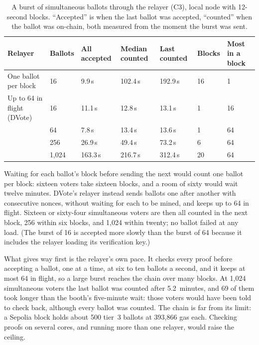 \begin{table}[htbp]
  \centering
  \caption{A burst of simultaneous ballots through the relayer (C3), local
    node with 12-second blocks. ``Accepted'' is when the last ballot was
    accepted, ``counted'' when the ballot was on-chain, both measured from the
    moment the burst was sent.}
  \label{tab:c3}
  \small
  \begin{tabular}{@{}L{3.6cm}R{1.4cm}R{2.0cm}R{2.0cm}R{2.0cm}R{1.4cm}R{2.0cm}@{}}
    \toprule
    \textbf{Relayer} & \textbf{Ballots} & \textbf{All accepted} & \textbf{Median counted} & \textbf{Last counted} & \textbf{Blocks} & \textbf{Most in a block} \\
    \midrule
    One ballot per block           & 16    & 9.9\,s   & 102.4\,s & 192.9\,s & 16 & 1 \\
    Up to 64 in flight (DVote)     & 16    & 11.1\,s  & 12.8\,s  & 13.1\,s  & 1  & 16 \\
                                   & 64    & 7.8\,s   & 13.4\,s  & 13.6\,s  & 1  & 64 \\
                                   & 256   & 26.9\,s  & 49.4\,s  & 73.2\,s  & 6  & 64 \\
                                   & 1,024 & 163.3\,s & 216.7\,s & 312.4\,s & 20 & 64 \\
    \bottomrule
  \end{tabular}
\end{table}

Waiting for each ballot's block before sending the next would count one ballot
per block: sixteen voters take sixteen blocks, and a room of sixty would wait
twelve minutes. DVote's relayer instead sends ballots one after another with
consecutive nonces, without waiting for each to be mined, and keeps up to 64 in
flight. Sixteen or sixty-four simultaneous voters are
then all counted in the next block, 256 within six blocks, and 1,024 within
twenty; no ballot failed at any load. (The burst of 16 is accepted more slowly
than the burst of 64 because it includes the relayer loading its verification
key.)

What gives way first is the relayer's own pace. It checks every proof before
accepting a ballot, one at a time, at six to ten ballots a second, and it
keeps at most 64 in flight, so a large burst reaches the chain over many
blocks. At 1,024 simultaneous voters the last ballot was counted after
5.2~minutes, and 69 of them took longer than the booth's five-minute
wait: those voters would have been told to check back, although every
ballot was counted. The chain is far from its limit: a Sepolia block holds
about 500 tier~3 ballots at 393,866 gas each. Checking proofs on several
cores, and running more than one relayer, would raise the ceiling.

